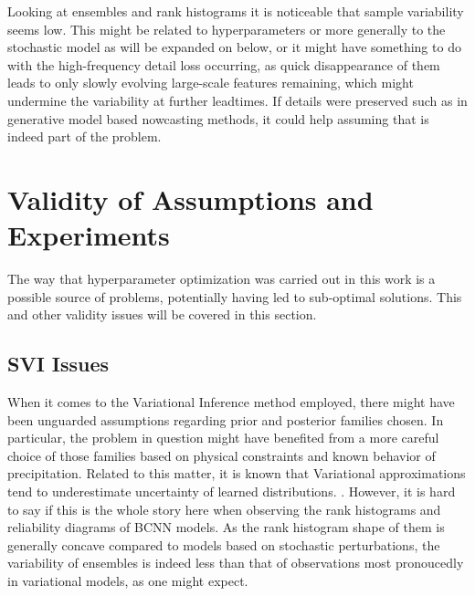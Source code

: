Looking at ensembles and rank histograms it is noticeable that sample variability seems low. This might be related to hyperparameters or more generally to the stochastic model as will be expanded on below, or it might have something to do with the high-frequency detail loss occurring, as quick disappearance of them leads to only slowly evolving large-scale features remaining, which might undermine the variability at further leadtimes. If details were preserved such as in generative model based nowcasting methods, it could help assuming that is indeed part of the problem. 


\section{Validity of Assumptions and Experiments}

The way that hyperparameter optimization was carried out in this work is a possible source of problems, potentially having led to sub-optimal solutions. This and other validity issues will be covered in this section.

\subsection*{SVI Issues}

When it comes to the Variational Inference method employed, there might have been unguarded assumptions regarding prior and posterior families chosen. In particular, the problem in question might have benefited from a more careful choice of those families based on physical constraints and known behavior of precipitation.   
Related to this matter, it is known that Variational approximations tend to underestimate uncertainty of learned distributions. \cite{bishop2006pattern, minka_family_nodate}. However, it is hard to say if this is the whole story here when observing the rank histograms and reliability diagrams of BCNN models. As the rank histogram shape of them is generally concave compared to models based on stochastic perturbations, the variability of ensembles is indeed less than that of observations most pronoucedly in variational models, as one might expect. 


